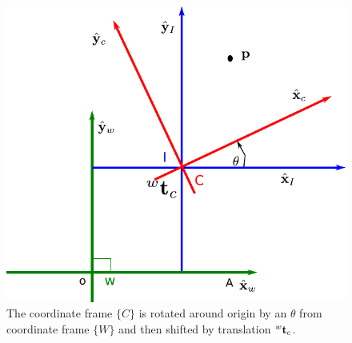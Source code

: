 \documentclass[twocolumn]{article}
\begin{document}
\begin{figure}
  \includegraphics[width=\linewidth]{media/rot+trans-2D.pdf}
  \caption{The coordinate  frame $\{C\}$  is rotated around origin by an $\theta$
    from coordinate  frame $\{W\}$ and then shifted by translation ${}^w\mathbf{t}_c$.}
  \label{fig:rot+trans-2D}
\end{figure}
\end{document}
